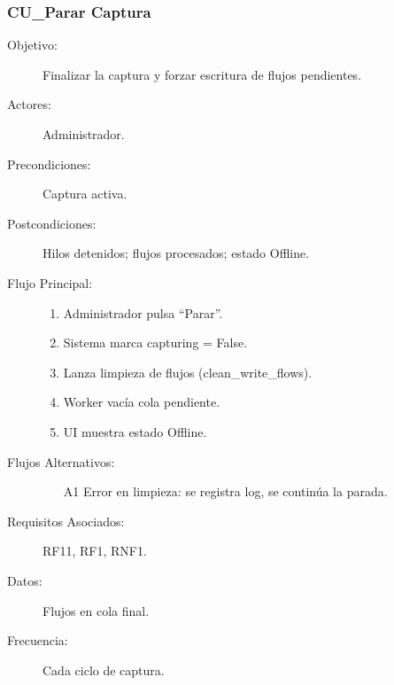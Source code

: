 \subsubsection{CU\_Parar Captura}
\begin{description}
  \item[Objetivo:] Finalizar la captura y forzar escritura de flujos pendientes.
  \item[Actores:] Administrador.
  \item[Precondiciones:] Captura activa.
  \item[Postcondiciones:] Hilos detenidos; flujos procesados; estado Offline.
  \item[Flujo Principal:]
    \begin{enumerate}
      \item Administrador pulsa “Parar”.
      \item Sistema marca capturing = False.
      \item Lanza limpieza de flujos (clean\_write\_flows).
      \item Worker vacía cola pendiente.
      \item UI muestra estado Offline.
    \end{enumerate}
  \item[Flujos Alternativos:]
    \begin{enumerate}
      \item[A1] Error en limpieza: se registra log, se continúa la parada.
    \end{enumerate}
  \item[Requisitos Asociados:] RF11, RF1, RNF1.
  \item[Datos:] Flujos en cola final.
  \item[Frecuencia:] Cada ciclo de captura.
\end{description}

